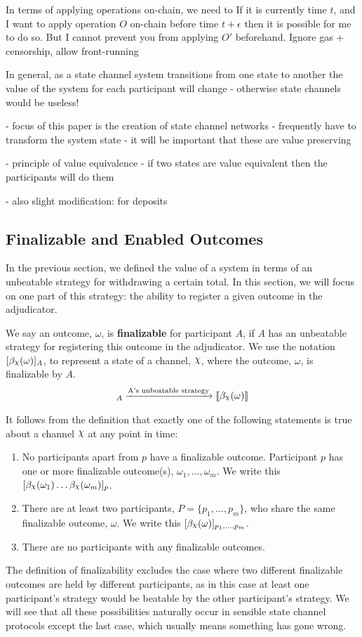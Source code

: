 \documentclass{article}
\DeclareRobustCommand{\rchi}{{\mathpalette\irchi\relax}}
\newcommand{\irchi}[2]{\raisebox{\depth}{$#1\chi$}} %
\theoremstyle{definition}
\newcommand{\adj}[1]{\llbracket #1 \rrbracket}
\newcommand{\enf}[1]{[#1]}
\begin{document}
In terms of applying operations on-chain, we need to
If it is currently time $t$, and I want to apply operation $O$ on-chain before time $t + \epsilon$
then it is possible for me to do so.
But I cannot prevent you from applying $O'$ beforehand.
Ignore gas + censorship, allow front-running

In general, as a state channel system transitions from one state to another the value of the system
for each participant will change - otherwise state channels would be useless!

- focus of this paper is the creation of state channel networks
- frequently have to transform the system state
- it will be important that these are value preserving

- principle of value equivalence - if two states are value equivalent then the participants will do them

- also slight modification: for deposits

\subsection{Finalizable and Enabled Outcomes}

In the previous section, we defined the value of a system in terms of an unbeatable strategy
for withdrawing a certain total.
In this section, we will focus on one part of this strategy: the ability to register a given
outcome in the adjudicator.

We say an outcome, $\omega$, is \textbf{finalizable} for participant $A$, if $A$ has an unbeatable
strategy for registering this outcome in the adjudicator.
We use the notation $\enf{\beta_\rchi(\omega)}_A$, to represent a state of a channel, $\rchi$,
where the outcome, $\omega$, is finalizable by $A$.
\begin{align*}
  \enf{\beta_\rchi(\omega)}_A \xrightarrow{\text{A's unbeatable strategy}} \adj{\beta_\rchi(\omega)}
\end{align*}

It follows from the definition that exactly one of the following statements is true about
a channel $\rchi$ at any point in time:
\begin{enumerate}
  \item No participants apart from $p$ have a finalizable outcome.
        Participant $p$ has one or more finalizable outcome(s), $\omega_1, \dots, \omega_m$.
        We write this $\enf{\beta_\rchi(\omega_1) \dots \beta_\rchi(\omega_m)}_p$.
  \item There are at least two participants, $P = \{p_1, \dots, p_m \}$, who share the same
        finalizable outcome, $\omega$. We write this $\enf{\beta_\rchi(\omega)}_{p_1, \dots, p_m}$.
  \item There are no participants with any finalizable outcomes.
\end{enumerate}
The definition of finalizability excludes the case where two different finalizable outcomes are held
by different participants, as in this case at least one participant's strategy would be beatable
by the other participant's strategy.
We will see that all these possibilities naturally occur in sensible state channel protocols
except the last case, which usually means something has gone wrong.
\end{document}
